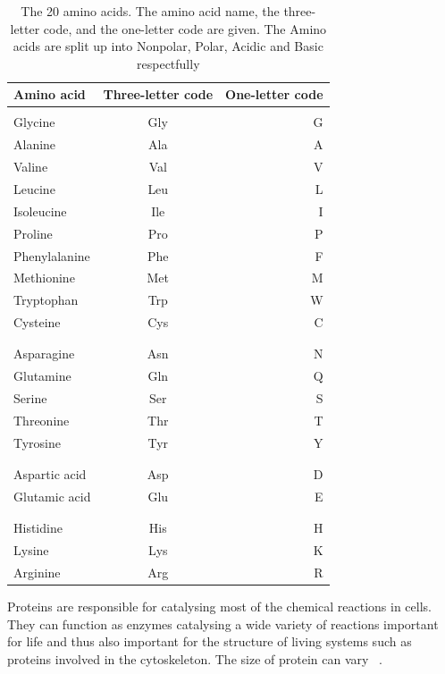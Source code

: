 \documentclass{report}
\begin{document}
\begin{table}[h!]
    \begin{center}
    \label{tab:Amino acids}
        \begin{tabular}{l|c|r}
        Amino acid & Three-letter code & One-letter code\\
        \hline
        \\
        Glycine & Gly & G\\
        Alanine & Ala & A\\
        Valine & Val & V\\
        Leucine & Leu & L\\
        Isoleucine & Ile & I\\
        Proline & Pro & P\\
        Phenylalanine & Phe & F\\
        Methionine & Met & M\\
        Tryptophan & Trp & W\\
        Cysteine & Cys & C\\
        \\
        \hline
        \\
        Asparagine & Asn & N\\
        Glutamine & Gln & Q\\
        Serine & Ser & S\\
        Threonine & Thr & T\\
        Tyrosine & Tyr & Y\\
        \\
        \hline
        \\
        Aspartic acid & Asp & D\\
        Glutamic acid & Glu & E\\
        \\
        \hline
        \\
        Histidine & His & H\\
        Lysine & Lys & K\\
        Arginine & Arg & R\\
        \end{tabular}
        \caption{\label{Amino acids}The 20 amino acids. The amino acid name, the three-letter code, and the one-letter code are given. The Amino acids are split up into Nonpolar, Polar, Acidic and Basic respectfully}
    \end{center}
\end{table}

Proteins are responsible for catalysing most of the chemical reactions in cells. They can function as enzymes catalysing a wide variety of reactions important for life and thus also important for the structure of living systems such as proteins involved in the cytoskeleton. The size of protein can vary ~\cite{zvelebil_understanding_2008}.
\end{document}
